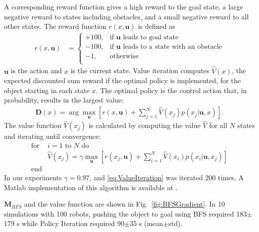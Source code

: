  A corresponding reward function gives a high reward to the goal state,  
 a large negative reward to states including obstacles, and a small negative reward to all other states.
The reward function $r(x,\mathbf{u})$ is defined as
\begin{align}
r(x,\mathbf{u}) &=  \left\{
\begin{array}{ll}
     +100, &  \textrm{if } \mathbf{u} \textrm{ leads to goal state}\\
      -100, & \textrm{if } \mathbf{u} \textrm{ leads to a state with an obstacle} \\
      -1, & \textrm{otherwise}\\
\end{array} 
\right.
\end{align}
 $\mathbf{u}$ is the action and $x$ is the current state.   %
  Value iteration computes $\hat{V}(x)$, the expected discounted sum reward if the optimal policy is implemented, for the object starting in each state $x$. The optimal policy is the control action that, in probability, results in the largest value:
   \begin{align} \mathbf{D}(x) = \arg\max_{\mathbf{u}}   [ r(x,\mathbf{u}) + \sum\limits_{j=1}^N \hat{V}(x_j) p(x_j| \mathbf{u},x)].  \label{eq:OptimalPolicy}
   \end{align}
   The value function $\hat{V}(x_j) $ is calculated by computing the value $\hat{V}$ for all $N$ states and iterating until convergence:
\begin{align}
\text{for }&\text{$i=1$ to $N$ do} \nonumber \\
&\hat{V} (x_j) = \gamma \max_{\mathbf{u}} [r(x_j,\mathbf{u}) + \sum\limits_{i=1}^N \hat{V}(x_i) p(x_i| \mathbf{u},x_j)] \label{eq:ValueIteration} \nonumber\\
\text{end}& 
\end{align}
In our experiments $\gamma = 0.97$, and \eqref{eq:ValueIteration} was iterated 200 times. A {\sc Matlab} implementation of this algorithm is available at \cite{Becker2015MDP}.

$\mathbf{M}_{BFS}$ and the value function are shown in Fig.~\ref{fig:BFSGradient}. 
In 10 simulations with 100 robots, pushing the object to goal using BFS required 183$\pm$179 s while Policy Iteration required 90$\pm$35 s (mean$\pm$std).


